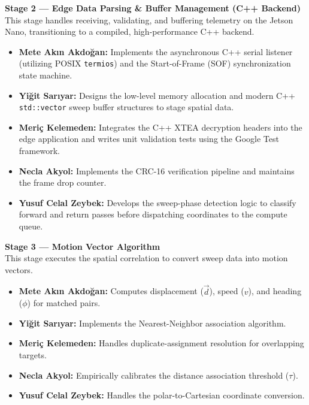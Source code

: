 \documentclass[14pt]{article}
\begin{document}
\textbf{Stage 2 --- Edge Data Parsing \& Buffer Management (C++ Backend)} \\
This stage handles receiving, validating, and buffering telemetry on the Jetson Nano, transitioning to a compiled, high-performance C++ backend.
\begin{itemize}
    \item \textbf{Mete Akın Akdoğan:} Implements the asynchronous C++ serial listener (utilizing POSIX \texttt{termios}) and the Start-of-Frame (SOF) synchronization state machine.
    \item \textbf{Yiğit Sarıyar:} Designs the low-level memory allocation and modern C++ \texttt{std::vector} sweep buffer structures to stage spatial data.
    \item \textbf{Meriç Kelemeden:} Integrates the C++ XTEA decryption headers into the edge application and writes unit validation tests using the Google Test framework.
    \item \textbf{Necla Akyol:} Implements the CRC-16 verification pipeline and maintains the frame drop counter.
    \item \textbf{Yusuf Celal Zeybek:} Develops the sweep-phase detection logic to classify forward and return passes before dispatching coordinates to the compute queue.
\end{itemize}

\textbf{Stage 3 --- Motion Vector Algorithm} \\
This stage executes the spatial correlation to convert sweep data into motion vectors.
\begin{itemize}
    \item \textbf{Mete Akın Akdoğan:} Computes displacement ($\vec{d}$), speed ($v$), and heading ($\phi$) for matched pairs.
    \item \textbf{Yiğit Sarıyar:} Implements the Nearest-Neighbor association algorithm.
    \item \textbf{Meriç Kelemeden:} Handles duplicate-assignment resolution for overlapping targets.
    \item \textbf{Necla Akyol:} Empirically calibrates the distance association threshold ($\tau$).
    \item \textbf{Yusuf Celal Zeybek:} Handles the polar-to-Cartesian coordinate conversion.
\end{itemize}
\end{document}
